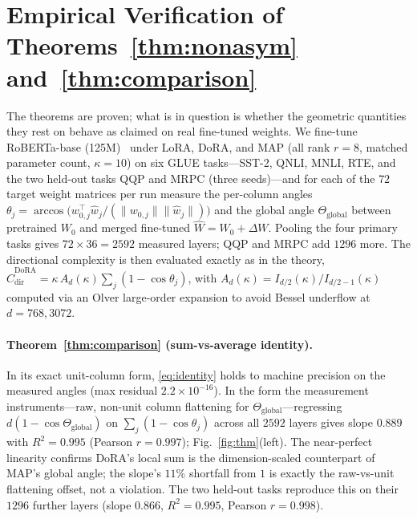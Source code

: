 \documentclass[11pt]{article}
\newcommand{\Thetaglob}{\Theta_{\mathrm{global}}}
\begin{document}
\section{Empirical Verification of Theorems~\ref{thm:nonasym} and~\ref{thm:comparison}}
\label{sec:experiments}
The theorems are proven; what is in question is whether the geometric quantities they
rest on behave as claimed on real fine-tuned weights. We fine-tune RoBERTa-base
(125M)~\cite{roberta} under LoRA, DoRA, and MAP (all rank $r{=}8$, matched
parameter count, $\kappa{=}10$) on six GLUE tasks---SST-2, QNLI, MNLI, RTE, and the two
held-out tasks QQP and MRPC (three seeds)---and for each of the $72$ target weight
matrices per run measure the per-column
angles $\theta_j=\arccos\!\big(w_{0,j}^\top\hat w_j/(\|w_{0,j}\|\|\hat w_j\|)\big)$ and
the global angle $\Thetaglob$ between pretrained $W_0$ and merged fine-tuned
$\hat W=W_0+\Delta W$. Pooling the four primary tasks gives $72\times36=2592$ measured
layers; QQP and MRPC add $1296$ more. The directional
complexity is then evaluated exactly as in the theory,
$\widehat C^{\mathrm{DoRA}}_{\mathrm{dir}}=\kappa\,A_d(\kappa)\sum_j(1-\cos\theta_j)$,
with $A_d(\kappa)=I_{d/2}(\kappa)/I_{d/2-1}(\kappa)$ computed via an Olver large-order
expansion to avoid Bessel underflow at $d=768,3072$.

\paragraph{Theorem~\ref{thm:comparison} (sum-vs-average identity).}
In its exact unit-column form, \eqref{eq:identity} holds to machine precision on the
measured angles (max residual $2.2\times10^{-16}$). In the form the measurement
instruments---raw, non-unit column flattening for $\Thetaglob$---regressing
$d(1-\cos\Thetaglob)$ on $\sum_j(1-\cos\theta_j)$ across all $2592$ layers gives slope
$0.889$ with $R^2=0.995$ (Pearson $r=0.997$); Fig.~\ref{fig:thm}(left). The
near-perfect linearity confirms DoRA's local sum is the dimension-scaled counterpart
of MAP's global angle; the slope's $11\%$ shortfall from $1$ is exactly the
raw-vs-unit flattening offset, not a violation. The two held-out tasks reproduce this
on their $1296$ further layers (slope $0.866$, $R^2=0.995$, Pearson $r=0.998$).
\end{document}
